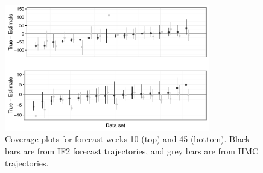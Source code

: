     \begin{figure}
        \centering
        \captionsetup{width=.8\linewidth}
        \includegraphics[width=0.8\textwidth]{./images/coverage.pdf}
        \caption{Coverage plots for forecast weeks 10 (top) and 45 (bottom). Black bars are from IF2 forecast trajectories, and grey bars are from HMC trajectories. \label{sirscoverage}}
    \end{figure}

